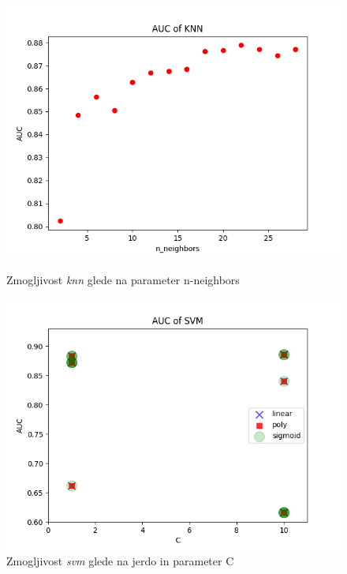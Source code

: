 \documentclass[12pt]{article}
\begin{document}
\begin{figure}[!htb]
      \includegraphics[width=\linewidth]{fig/knn.png}
      \caption{Zmogljivost \emph{knn} glede na parameter n-neighbors}
      \label{fig:knn}
    \endminipage\hfill
      \includegraphics[width=\linewidth]{fig/svm.png}
      \caption{Zmogljivost \emph{svm} glede na jerdo in parameter C}
      \label{fig:svm}
    \endminipage
\end{figure}
\end{document}
